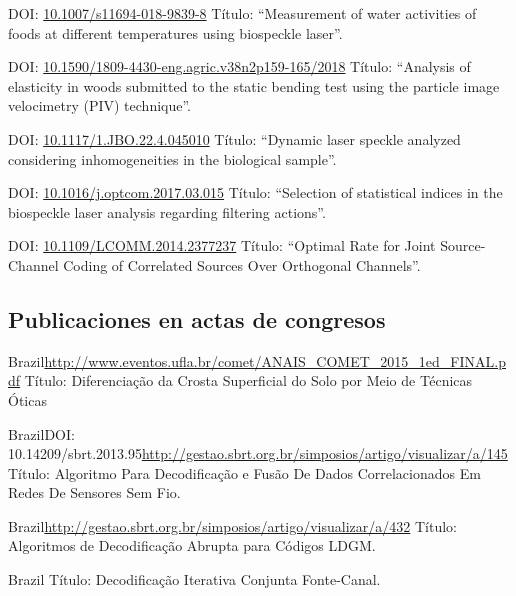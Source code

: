 \documentclass[11pt,a4paper,sans]{moderncv} %
\newcommand{\doiurl}[1]{\href{https://doi.org/#1}{#1}}
\begin{document}
	      {DOI: \doiurl{10.1007/s11694-018-9839-8}}{}{}
	      {Título: ``Measurement of water activities of foods at different temperatures using biospeckle laser''.}

	      {DOI: \doiurl{10.1590/1809-4430-eng.agric.v38n2p159-165/2018}}{}{}
	      {Título: ``Analysis of elasticity in woods submitted to the static bending test using the particle image velocimetry (PIV) technique''.}

	      {DOI: \doiurl{10.1117/1.JBO.22.4.045010}}{}{}
	      {Título: ``Dynamic laser speckle analyzed considering inhomogeneities in the biological sample''.}
	      
	      {DOI: \doiurl{10.1016/j.optcom.2017.03.015}}{}{}
	      {Título: ``Selection of statistical indices in the biospeckle laser analysis regarding filtering actions''.}
	      
	      {DOI: \doiurl{10.1109/LCOMM.2014.2377237}}{}{}
	      {Título: ``Optimal  Rate for Joint Source-Channel Coding of Correlated Sources Over Orthogonal Channels''.}

\subsection{Publicaciones en actas de congresos}

	      {Brazil}{}{\url{http://www.eventos.ufla.br/comet/ANAIS\_COMET\_2015\_1ed\_FINAL.pdf}}
	      {Título: Diferenciação da Crosta Superficial do Solo por Meio de Técnicas Óticas}

	      {Brazil}{DOI: 10.14209/sbrt.2013.95}{\url{http://gestao.sbrt.org.br/simposios/artigo/visualizar/a/145}}
	      {Título: Algoritmo Para Decodificação e Fusão De Dados Correlacionados Em Redes De Sensores Sem Fio.}

	      {Brazil}{}{\url{http://gestao.sbrt.org.br/simposios/artigo/visualizar/a/432}}
	      {Título: Algoritmos de Decodificação Abrupta para Códigos LDGM.}

	      {Brazil}{}{}%
	      {Título: Decodificação Iterativa Conjunta Fonte-Canal.}
\end{document}
